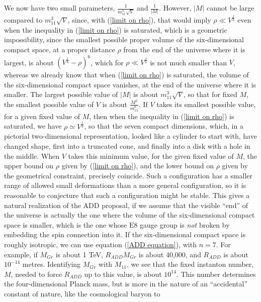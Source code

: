 \documentclass[a4paper,12pt,oneside]{article}
\begin{document}
We now have two small parameters,
$\frac{1}{m_{11}^3\sqrt{V}}$ and $\frac{1}{\vert M\vert}$.  However,
$\vert M\vert$ cannot be large compared to $m_{11}^3\sqrt{V}$, 
since, with (\ref{limit on rho}), that would imply $\rho\ll 
V^{\frac{1}{6}}$ even when the
inequality in (\ref{limit on rho}) is saturated, which is a 
geometric 
impossibility, since the smallest possible proper volume of the
six-dimensional compact space, at a proper distance $\rho$ from the
end of the universe where it is largest, is about $(V^{\frac{1}{6}} 
- \rho)^6$, which for $\rho\ll V^{\frac{1}{6}}$ is not much smaller
than $V$, whereas we already know that when (\ref{limit on rho}) is 
saturated, the volume of the six-dimensional compact space
vanishes, at the end of the universe where it is smaller.  The 
largest possible value of $\vert M\vert$ is about
$m_{11}^3\sqrt{V}$, so that for fixed $M$, the smallest possible
value of $V$ is about $\frac{M^2}{m_{11}^6}$.  If $V$ takes its
smallest possible value, for a given fixed value of $M$, then when
the inequality in (\ref{limit on rho}) is saturated, we have 
$\rho\simeq
V^{\frac{1}{6}}$, so that the seven compact dimensions, which, in a
pictorial two-dimensional representation, looked like a cylinder to 
start with, have changed shape, first into a truncated cone, and 
finally into a disk with a hole in the middle.  When $V$ takes this 
minimum value, for the given fixed value of $M$, the upper bound on 
$\rho$ given by (\ref{limit on rho}), and the lower bound on $\rho$ 
given by the geometrical constraint, precisely coincide.  Such a 
configuration has a smaller range of allowed small deformations 
than a more general configuration, so it is reasonable to 
conjecture that such a configuration might be stable.  This gives a 
natural realization of the ADD proposal, if we assume that the 
visible ``end'' of the universe is actually the one where the 
volume of the six-dimensional compact space is smaller, which is the
one whose $\mathrm{E}8$ gauge group is \emph{not} broken by 
embedding the spin connection into it.  If the six-dimensional
compact space is roughly isotropic, we can use equation (\ref{ADD equation}),
with $n = 7$.  For example, if $M_{Gr}$ is 
about 1 TeV, $R_{ADD}M_{Gr}$ is about 40,000, and $R_{ADD}$ is 
about $10^{-14}$ metres.  Identifying $M_{Gr}$ with $M_{11}$, we see
that the fixed instanton number, $M$, needed to force $R_{ADD}$ up 
to this value, is about $10^{14}$.  This number determines the 
four-dimensional Planck mass, but is more in the nature of an
``accidental'' constant of nature, like the cosmological baryon to
\end{document}
